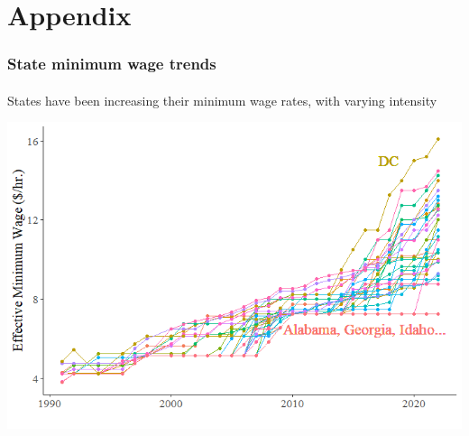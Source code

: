 
\section{Appendix}

\begin{frame}

    \label{min_wage_plot_allstates}
    
    \frametitle{State minimum wage trends} %
    \framesubtitle{}  %
    \rmfamily %
    
    \begin{wideitemize}
        \item States have been increasing their \textcolor{fblu}{minimum wage rates}, with varying intensity
    \end{wideitemize}

    \begin{center}
        \includegraphics[scale=0.5]{min_wage_plot.png}
    \end{center}
    
    \hyperlink{Minimum Wage}{}
    
\end{frame}

